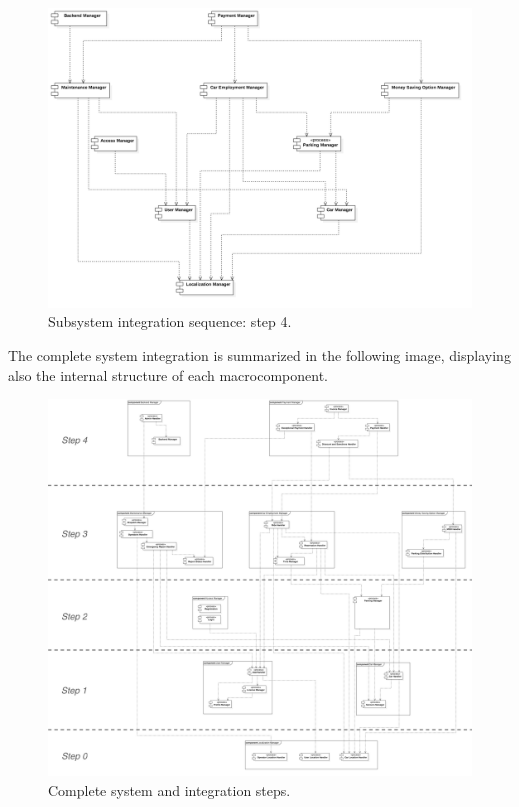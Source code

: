 			\begin{figure}[h]
				\includegraphics[width=\textwidth,center]{img/integration_strategy/steps/high_level_components_lv4.png}
				\caption{Subsystem integration sequence: step 4.}
			\end{figure}
		\FloatBarrier

			The complete system integration is summarized in the following image, displaying also the internal structure of each macrocomponent.
			\begin{figure}[h]
				\includegraphics[width=\textwidth,center]{img/integration_strategy/complete_unravelled-steps.png}
				\caption{Complete system and integration steps.}
			\end{figure}
		\FloatBarrier
\hphantom{spaces} %
